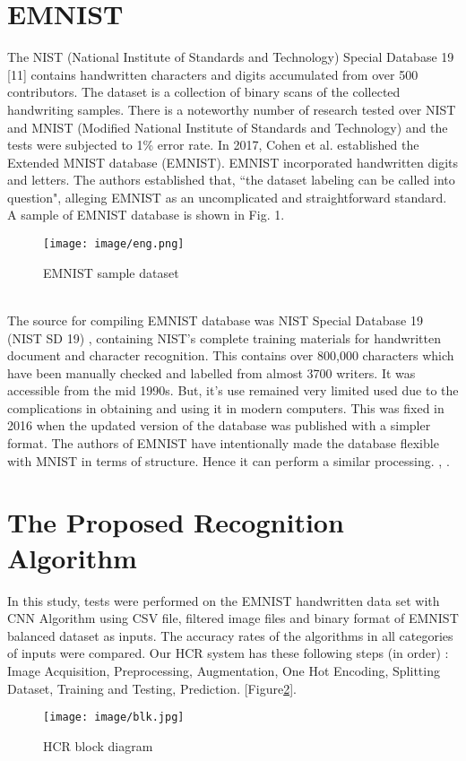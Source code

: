 \documentclass[conference]{IEEEtran}
\begin{document}
\section{EMNIST}
The NIST (National Institute of Standards and Technology) Special Database 19 [11] contains handwritten characters and digits accumulated from over 500 contributors. The dataset is a collection of binary scans of the collected handwriting samples. There is a noteworthy number of research tested over NIST and MNIST (Modified National Institute of Standards and Technology) and the tests were subjected to 1\% error rate. In 2017, Cohen et al. \cite{Cohen2017} established the Extended MNIST database (EMNIST). EMNIST incorporated handwritten digits and letters. The authors established that, “the dataset labeling can be called into question", alleging EMNIST as an uncomplicated and straightforward standard. A sample of EMNIST database is shown in Fig. 1.
\begin{figure}[htp]
    \centering
    \texttt{[image: image/eng.png]}
    \caption{EMNIST sample dataset}
    \label{sample}
\end{figure} \\
The source for compiling EMNIST database was NIST Special Database 19 (NIST SD 19) , containing NIST’s complete training materials for handwritten document and character recognition. This contains over 800,000 characters which have been manually checked and labelled from almost 3700 writers. It was accessible from the mid 1990s. But, it's use remained very limited used due to the complications in obtaining and using it in modern computers. This was fixed in 2016 when the updated version of the database was published with a simpler format. The authors of EMNIST have intentionally made the database flexible with MNIST in terms of structure. Hence it can perform a similar processing. \cite{Baldominos2019}, \cite{Cohen2017}.

\section{The Proposed Recognition Algorithm}
In this study, tests were performed on the EMNIST 
handwritten data set with CNN 
Algorithm using CSV file, filtered image files and binary format of EMNIST balanced dataset as inputs. The accuracy rates of the algorithms in 
all categories of inputs were 
compared. Our HCR system has these following steps (in order) : Image Acquisition, Preprocessing, Augmentation, One Hot Encoding, Splitting Dataset, Training and Testing, Prediction. [Figure\ref{blk}].
\begin{figure}[htp]
    \centering
    \texttt{[image: image/blk.jpg]}
    \caption{HCR block diagram}
    \label{blk}
\end{figure}\\
\end{document}
